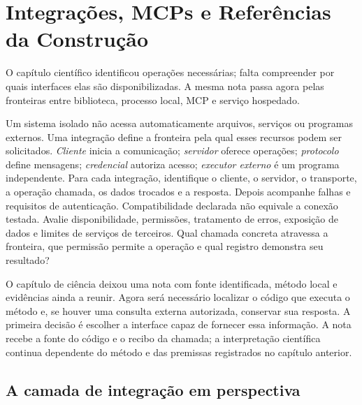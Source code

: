 \chapter{Integrações, MCPs e Referências da Construção}

O capítulo científico identificou operações necessárias; falta compreender por quais interfaces elas são disponibilizadas. A mesma nota passa agora pelas fronteiras entre biblioteca, processo local, MCP e serviço hospedado.


\roteirodidatico
{Um sistema isolado não acessa automaticamente arquivos, serviços ou programas externos. Uma integração define a fronteira pela qual esses recursos podem ser solicitados.}
{\emph{Cliente} inicia a comunicação; \emph{servidor} oferece operações; \emph{protocolo} define mensagens; \emph{credencial} autoriza acesso; \emph{executor externo} é um programa independente.}
{Para cada integração, identifique o cliente, o servidor, o transporte, a operação chamada, os dados trocados e a resposta. Depois acompanhe falhas e requisitos de autenticação.}
{Compatibilidade declarada não equivale a conexão testada. Avalie disponibilidade, permissões, tratamento de erros, exposição de dados e limites de serviços de terceiros.}
{Qual chamada concreta atravessa a fronteira, que permissão permite a operação e qual registro demonstra seu resultado?}

{O capítulo de ciência deixou uma nota com fonte identificada, método local e evidências ainda a reunir. Agora será necessário localizar o código que executa o método e, se houver uma consulta externa autorizada, conservar sua resposta. A primeira decisão é escolher a interface capaz de fornecer essa informação. A nota recebe a fonte do código e o recibo da chamada; a interpretação científica continua dependente do método e das premissas registrados no capítulo anterior.}

\section{A camada de integração em perspectiva}


